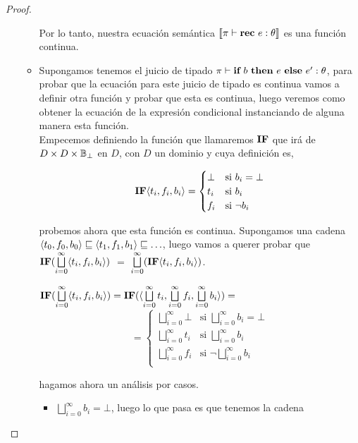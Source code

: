 \begin{proof}
\begin{itemize}
\begin{itemize}
Por lo tanto, nuestra ecuaci\'on sem\'antica $\llbracket \pi \vdash \textbf{rec} \ e : \theta \rrbracket$ es
una funci\'on continua.

\item Supongamos tenemos el juicio de tipado $\pi \vdash \textbf{if} \ b \ \textbf{then} \ e \ \textbf{else} \ e' : \theta$, para
probar que la ecuaci\'on para este juicio de tipado es continua vamos a definir otra funci\'on
y probar que esta es continua, luego veremos como obtener la ecuaci\'on de la expresi\'on 
condicional instanciando de alguna manera esta funci\'on.\\

Empecemos definiendo la funci\'on que llamaremos $\textbf{IF}$ que ir\'a de $D \times D \times \mathbb{B}_\bot$ en
$D$, con $D$ un dominio y cuya definici\'on es,

\[
\textbf{IF} \langle t_i,f_i,b_i \rangle=
\begin{cases}
\bot & \text{si } b_i = \bot \\
t_i  & \text{si } b_i\\
f_i  & \text{si } \neg b_i\\
\end{cases}
\]

probemos ahora que esta funci\'on es continua. Supongamos una cadena 
$\langle t_0,f_0,b_0 \rangle \sqsubseteq \langle t_1,f_1,b_1 \rangle \sqsubseteq \ldots$, luego
vamos a querer probar que $\textbf{IF} (\bigsqcup\limits^{\infty}_{i=0}\langle t_i,f_i,b_i \rangle)$ $=$
$\bigsqcup\limits^{\infty}_{i=0} (\textbf{IF} \langle t_i,f_i,b_i \rangle)$.


$\textbf{IF} (\bigsqcup\limits^{\infty}_{i=0}\langle t_i,f_i,b_i \rangle) =
\textbf{IF} (\langle \bigsqcup\limits^{\infty}_{i=0}t_i
    ,\bigsqcup\limits^{\infty}_{i=0}f_i
    ,\bigsqcup\limits^{\infty}_{i=0}b_i \rangle) =$
\[
=
\begin{cases}
\bigsqcup\limits^{\infty}_{i=0} \bot & \text{si } \bigsqcup\limits^{\infty}_{i=0}b_i = \bot \\
\bigsqcup\limits^{\infty}_{i=0}t_i & \text{si } \bigsqcup\limits^{\infty}_{i=0}b_i\\
\bigsqcup\limits^{\infty}_{i=0}f_i & \text{si } \neg \bigsqcup\limits^{\infty}_{i=0}b_i\\
\end{cases}
\]

hagamos ahora un an\'alisis por casos.

\begin{itemize}
\item $\bigsqcup\limits^{\infty}_{i=0}b_i = \bot$, luego lo que pasa es que tenemos
la cadena \\


\end{itemize}
\end{itemize}
\end{itemize}
\end{proof}
